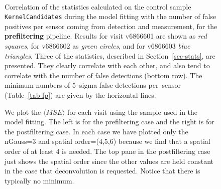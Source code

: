 \documentclass[prd, nofootinbib, floatfix, 11pt,tightenlines,times]{article}
\begin{document}
\begin{figure}
 \\
\caption{Correlation of the statistics calculated on the control
  sample {\tt KernelCandidates} during the model fitting with the
  number of false positives per sensor coming from detection and
  measurement, for the {\bf prefiltering} pipeline.  Results for visit
  v6866601 are shown as {\it red squares}, for v6866602 as {\it green
    circles}, and for v6866603 {\it blue triangles}.  Three of the
  statistics, described in Section~\ref{sec-stats}, are presented.
  They clearly correlate with each other, and also tend to correlate
  with the number of false detections (bottom row).
  The minimum numbers of 5--sigma false detections per--sensor (Table~\ref{tab-fp})
  are given by the horizontal lines.
}
\label{corrpre}
\end{figure}

\begin{figure}%
\centering
{}
\caption{We plot the $\langle MSE \rangle$ for each visit using the sample used in the model fitting.  
The left is for the prefiltering case and the right is for the 
postfiltering case.  In each case we have plotted only the nGauss=3 and spatial order=(4,5,6) because we find that a spatial
order of at least 4 is needed.  The top pane in the postfiltering case just shows the spatial order since the other 
values are held constant in the case that deconvolution is requested.  Notice that there is typically no minimum.}
\label{fig-MSE_FITTED}
\end{figure}
\end{document}
